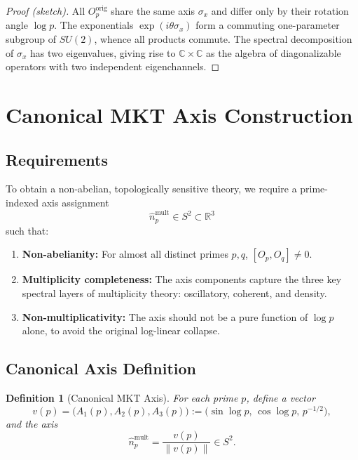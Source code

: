 \documentclass[11pt]{article}
\newtheorem{definition}[theorem]{Definition}
\theoremstyle{remark}
\begin{document}
\begin{proof}[Proof (sketch)]
All $O_p^{\text{orig}}$ share the same axis $\sigma_x$ and differ only by their
rotation angle $\log p$. The exponentials $\exp(i\theta\sigma_x)$ form a commuting
one-parameter subgroup of $SU(2)$, whence all products commute. The spectral
decomposition of $\sigma_x$ has two eigenvalues, giving rise to
$\mathbb{C}\times\mathbb{C}$ as the algebra of diagonalizable operators with
two independent eigenchannels.
\end{proof}

\section{Canonical MKT Axis Construction}

\subsection{Requirements}

To obtain a non-abelian, topologically sensitive theory, we require a prime-indexed
axis assignment
\[
  \hat{n}_p^{\text{mult}} \in S^2 \subset \mathbb{R}^3
\]
such that:

\begin{enumerate}[label=(\roman*),leftmargin=*]
  \item \textbf{Non-abelianity:} For almost all distinct primes $p, q$,
        $[O_p,O_q] \neq 0$.
  \item \textbf{Multiplicity completeness:} The axis components capture the three
        key spectral layers of multiplicity theory: oscillatory, coherent, and
        density.
  \item \textbf{Non-multiplicativity:} The axis should not be a pure function of
        $\log p$ alone, to avoid the original log-linear collapse.
\end{enumerate}

\subsection{Canonical Axis Definition}

\begin{definition}[Canonical MKT Axis]
For each prime $p$, define a vector
\[
  v(p) = 
  \bigl(A_1(p), A_2(p), A_3(p)\bigr)
  := \bigl(\sin\log p,\, \cos\log p,\, p^{-1/2}\bigr),
\]
and the axis
\[
  \hat{n}_p^{\text{mult}} = \frac{v(p)}{\|v(p)\|} \in S^2.
\]
\end{definition}
\end{document}
